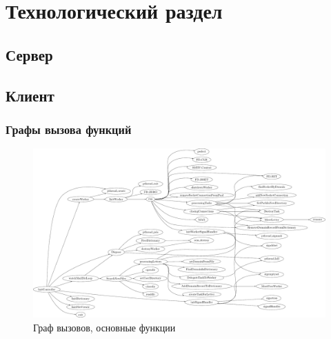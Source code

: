 \documentclass[a4paper,12pt]{report}
\begin{document}
\chapter{Технологический раздел}

\section{Сервер}

\section{Клиент}

\subsection{Графы вызова функций}

\begin{figure}
    \centering
    \includegraphics[width=\textwidth]{include/ccflow01_dot.pdf}
    \caption{Граф вызовов, основные функции}
    \label{fig:ccflow01}
\end{figure}
    
\end{document}
